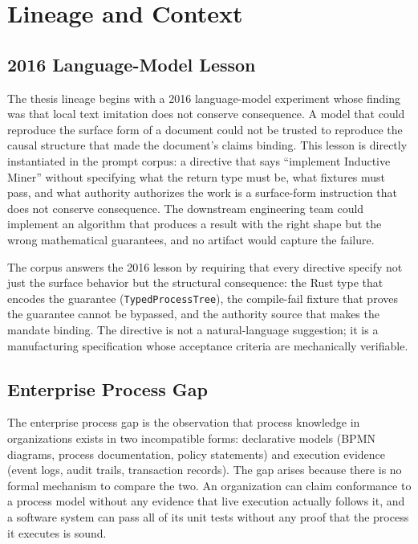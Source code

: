
\section{Lineage and Context}
\label{sec:prompts-lineage}

\subsection{2016 Language-Model Lesson}
\label{sec:prompts-lineage-2016}

The thesis lineage begins with a 2016 language-model experiment whose finding was
that local text imitation does not conserve consequence. A model that could reproduce
the surface form of a document could not be trusted to reproduce the causal structure
that made the document's claims binding. This lesson is directly instantiated in the
prompt corpus: a directive that says ``implement Inductive Miner'' without specifying
what the return type must be, what fixtures must pass, and what authority authorizes
the work is a surface-form instruction that does not conserve consequence. The
downstream engineering team could implement an algorithm that produces a result with
the right shape but the wrong mathematical guarantees, and no artifact would capture
the failure.

The corpus answers the 2016 lesson by requiring that every directive specify not just
the surface behavior but the structural consequence: the Rust type that encodes the
guarantee (\texttt{TypedProcessTree}), the compile-fail fixture that proves the
guarantee cannot be bypassed, and the authority source that makes the mandate
binding. The directive is not a natural-language suggestion; it is a manufacturing
specification whose acceptance criteria are mechanically verifiable.

\subsection{Enterprise Process Gap}
\label{sec:prompts-lineage-enterprise}

The enterprise process gap is the observation that process knowledge in organizations
exists in two incompatible forms: declarative models (BPMN diagrams, process
documentation, policy statements) and execution evidence (event logs, audit trails,
transaction records). The gap arises because there is no formal mechanism to compare
the two. An organization can claim conformance to a process model without any
evidence that live execution actually follows it, and a software system can pass all
of its unit tests without any proof that the process it executes is sound.

